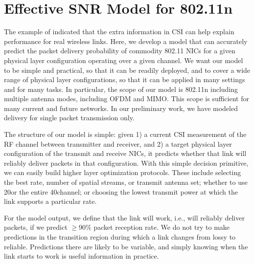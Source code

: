\section{Effective SNR Model for 802.11n}
The example of  indicated that the extra information in CSI can help explain performance for real wireless links. Here, we develop a model that can accurately predict the packet delivery probability of commodity 802.11 NICs for a given physical layer configuration operating over a given channel. We want our model to be simple and practical, so that it can be readily deployed, and to cover a wide range of physical layer configurations, so that it can be applied in many settings and for many tasks. In particular, the scope of our model is 802.11n including multiple antenna modes, including OFDM and MIMO\@. This scope is sufficient for many current and future networks. In our preliminary work, we have modeled delivery for single packet transmission only.

The structure of our model is simple: given 1) a current CSI measurement of the RF channel between transmitter and receiver, and 2) a target physical layer configuration of the transmit and receive NICs, it predicts whether that link will reliably deliver packets in that configuration.
With this simple decision primitive, we can easily build higher layer optimization protocols. These include selecting the best rate, number of spatial streams, or transmit antenna set; whether to use 20\MHz or the entire 40\MHz channel; or choosing the lowest transmit power at which the link supports a particular rate.

For the model output, we define that the link will work, i.e., will reliably deliver packets, if we predict $\geq$90\% packet reception rate. We do not try to make predictions in the transition region during which a link changes from lossy to reliable. Predictions there are likely to be variable, and simply knowing when the link starts to work is useful information in practice.

\ifx\mainfile\undefined

\fi
